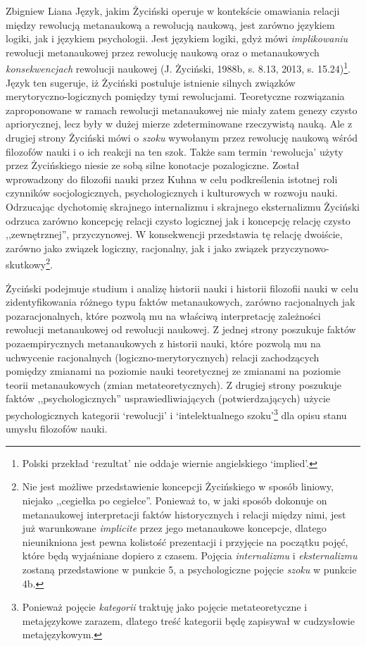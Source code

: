 \begin{artplenv}{Zbigniew Liana}
Język, jakim Życiński operuje w kontekście omawiania relacji między rewolucją metanaukową a rewolucją naukową, jest
zarówno językiem logiki, jak i językiem psychologii. Jest językiem logiki, gdyż mówi \textit{implikowaniu} rewolucji
metanaukowej przez rewolucję naukową oraz o metanaukowych \textit{konsekwencjach} rewolucji naukowej
\label{ref:RND7WtbaMWBYd}(J. Życiński, 1988b, s. 8.13, 2013, s. 15.24)\footnote{Polski przekład `rezultat' nie oddaje
wiernie angielskiego `implied'.}. Język ten sugeruje, iż Życiński postuluje istnienie silnych związków
merytoryczno-logicznych pomiędzy tymi rewolucjami. Teoretyczne rozwiązania zaproponowane w ramach rewolucji
metanaukowej nie miały zatem genezy czysto apriorycznej, lecz były w dużej mierze  zdeterminowane rzeczywistą nauką.
Ale z drugiej strony Życiński mówi o \textit{szoku }wywołanym przez rewolucję naukową wśród filozofów nauki i o ich
reakcji na ten szok. Także sam termin `rewolucja' użyty przez Życińskiego niesie ze sobą silne konotacje pozalogiczne.
Został wprowadzony do filozofii nauki przez Kuhna w celu podkreślenia istotnej roli czynników socjologicznych,
psychologicznych i kulturowych w rozwoju nauki. Odrzucając dychotomię skrajnego internalizmu i skrajnego eksternalizmu
Życiński odrzuca zarówno koncepcję relacji czysto logicznej jak i koncepcję relację czysto ,,zewnętrznej'',
przyczynowej. W konsekwencji przedstawia tę relację dwoiście, zarówno jako związek logiczny, racjonalny, jak i jako związek
przyczynowo-skutkowy\footnote{Nie jest możliwe przedstawienie koncepcji Życińskiego w sposób liniowy, niejako ,,cegiełka
po cegiełce''. Ponieważ to, w jaki sposób dokonuje on metanaukowej interpretacji faktów historycznych i relacji między
nimi, jest już warunkowane \textit{implicite} przez jego metanaukowe koncepcje, dlatego nieunikniona jest pewna kolistość
prezentacji i przyjęcie na początku pojęć, które będą wyjaśniane dopiero z czasem. Pojęcia \textit{internalizmu} i \textit{eksternalizmu}
zostaną przedstawione w punkcie 5, a psychologiczne pojęcie \textit{szoku} w punkcie 4b.}.

Życiński podejmuje studium i analizę historii nauki i historii filozofii nauki w celu zidentyfikowania różnego typu
faktów metanaukowych, zarówno racjonalnych jak pozaracjonalnych, które pozwolą mu na właściwą interpretację zależności
rewolucji metanaukowej od rewolucji naukowej. Z jednej strony poszukuje faktów pozaempirycznych metanaukowych z historii
nauki, które pozwolą mu na uchwycenie racjonalnych (logiczno-merytorycznych) relacji zachodzących pomiędzy
zmianami na poziomie nauki teoretycznej ze zmianami na poziomie teorii metanaukowych (zmian metateoretycznych). Z drugiej
strony poszukuje faktów ,,psychologicznych'' usprawiedliwiających (potwierdzających) użycie psychologicznych
kategorii `rewolucji' i `intelektualnego szoku'\footnote{Ponieważ pojęcie \textit{kategorii} traktuję jako pojęcie
metateoretyczne i metajęzykowe zarazem, dlatego treść kategorii będę zapisywał w cudzysłowie metajęzykowym.} dla opisu
stanu umysłu filozofów nauki.


\end{artplenv}
